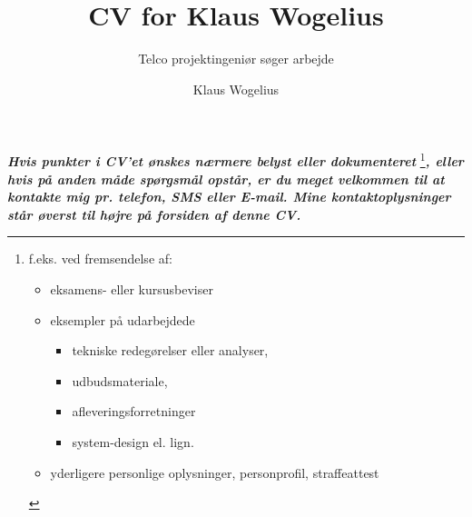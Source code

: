 \documentclass[10pt,twoside,a4paper]{curve} %
\title{CV for Klaus Wogelius}
\subtitle{Telco projektingeniør søger arbejde}
\author{Klaus Wogelius}
\begin{document}
\makeheaders 
\maketitle
{}
\pagebreak
{}
\vfill %
\textbf{\textit{Hvis punkter i CV'et ønskes nærmere belyst eller dokumenteret}}
\footnote{
f.eks. ved fremsendelse af:
\begin{itemize}
\item eksamens- eller kursusbeviser
\item eksempler på udarbejdede 
\begin{itemize}
\item tekniske redegørelser eller analyser,
\item udbudsmateriale,
\item afleveringsforretninger
\item system-design el. lign.
\end{itemize}
\item yderligere personlige oplysninger, personprofil, straffeattest
\end{itemize}
}\textbf{\textit{, eller hvis på anden måde spørgsmål opstår, er du meget velkommen til at kontakte mig pr. telefon, SMS eller E-mail. Mine kontaktoplysninger står øverst til højre på forsiden af denne CV.}}
\vspace{10mm}
%
%
\end{document}
